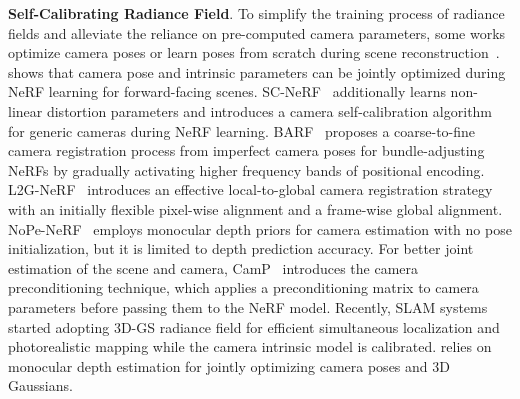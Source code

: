 \textbf{Self-Calibrating Radiance Field}.
To simplify the training process of radiance fields and alleviate the reliance on pre-computed camera parameters, some works optimize camera poses or learn poses from scratch during scene reconstruction~\citep{wang2021nerfmm, jeong2021self, lin2021barf}. 
\citet{wang2021nerfmm} shows that camera pose and intrinsic parameters can be jointly optimized during NeRF learning for forward-facing scenes. 
SC-NeRF~\citep{jeong2021self} additionally learns non-linear distortion parameters and introduces a camera self-calibration algorithm for generic cameras during NeRF learning.
BARF~\citep{lin2021barf} proposes a coarse-to-fine camera registration process from imperfect camera poses for bundle-adjusting NeRFs by gradually activating higher frequency bands of positional encoding. 
L2G-NeRF~\citep{chen2023local} introduces an effective local-to-global camera registration strategy with an initially flexible pixel-wise alignment and a frame-wise global alignment. %
NoPe-NeRF~\citep{bian2023nope} employs monocular depth priors for camera estimation with no pose initialization, but it is limited to depth prediction accuracy.  
For better joint estimation of the scene and camera, CamP~\citep{park2023camp} introduces the camera preconditioning technique, which applies a preconditioning matrix to camera parameters before passing them to the NeRF model.
Recently, SLAM systems~\citep{hhuang2024photoslam, yan2023gsslam, matsuki_and_murai2024gsslam, keetha2024splatam} started adopting 3D-GS radiance field for efficient simultaneous localization and photorealistic mapping while the camera intrinsic model is calibrated. \citet{fu2024colmap} relies on monocular depth estimation for jointly optimizing camera poses and 3D Gaussians. 

